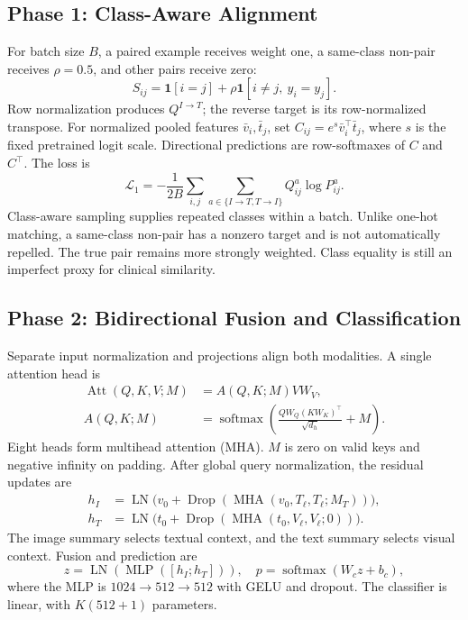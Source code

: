 \documentclass[conference,a4paper]{IEEEtran}
\begin{document}
\subsection{Phase 1: Class-Aware Alignment}
For batch size $B$, a paired example receives weight one, a same-class non-pair receives $\rho=0.5$, and other pairs receive zero:
\begin{equation}
S_{ij}=\mathbf1[i=j]+\rho\mathbf1[i\ne j,\ y_i=y_j].
\label{eq:target}
\end{equation}
Row normalization produces $Q^{I\to T}$; the reverse target is its row-normalized transpose. For normalized pooled features $\bar v_i,\bar t_j$, set $C_{ij}=e^s\bar v_i^\top\bar t_j$, where $s$ is the fixed pretrained logit scale. Directional predictions are row-softmaxes of $C$ and $C^\top$. The loss is
\begin{equation}
\mathcal L_1=-\frac{1}{2B}\sum_{i,j}\sum_{a\in\{I\to T,T\to I\}}
Q^a_{ij}\log P^a_{ij}.
\label{eq:loss1}
\end{equation}
Class-aware sampling supplies repeated classes within a batch. Unlike one-hot matching, a same-class non-pair has a nonzero target and is not automatically repelled. The true pair remains more strongly weighted. Class equality is still an imperfect proxy for clinical similarity.

\subsection{Phase 2: Bidirectional Fusion and Classification}
Separate input normalization and projections align both modalities. A single attention head is
\begin{equation}
\begin{split}
\operatorname{Att}(Q,K,V;M)&=A(Q,K;M)VW_V,\\
A(Q,K;M)&=\operatorname{softmax}
\left(\frac{QW_Q(KW_K)^\top}{\sqrt{d_h}}+M\right).
\end{split}
\label{eq:att}
\end{equation}
Eight heads form multihead attention (MHA). $M$ is zero on valid keys and negative infinity on padding. After global query normalization, the residual updates are
\begin{align}
h_I&=\operatorname{LN}\big(v_0+\operatorname{Drop}(\operatorname{MHA}(v_0,T_\ell,T_\ell;M_T))\big),\nonumber\\
h_T&=\operatorname{LN}\big(t_0+\operatorname{Drop}(\operatorname{MHA}(t_0,V_\ell,V_\ell;0))\big).
\label{eq:bi}
\end{align}
The image summary selects textual context, and the text summary selects visual context. Fusion and prediction are
\begin{equation}
z=\operatorname{LN}(\operatorname{MLP}([h_I;h_T])),\quad
p=\operatorname{softmax}(W_cz+b_c),
\label{eq:head}
\end{equation}
where the MLP is $1024\to512\to512$ with GELU and dropout. The classifier is linear, with $K(512+1)$ parameters.
\end{document}
